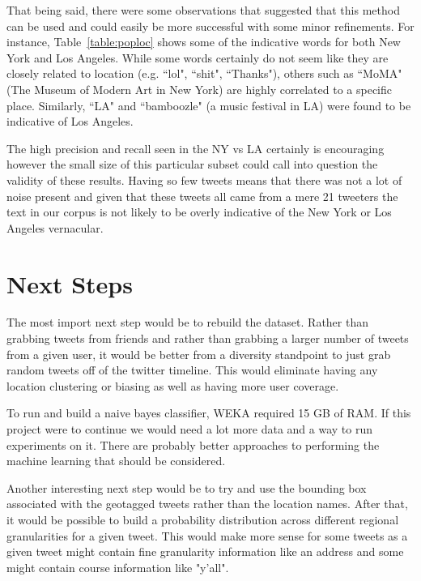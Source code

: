 \documentclass[12pt]{article}
\begin{document}
That being said, there were some observations that suggested that this method can be used and could easily be more successful with some minor refinements.  For instance, Table~\ref{table:poploc} shows some of the indicative words for both New York and Los Angeles.  While some words certainly do not seem like they are closely related to location (e.g. ``lol", ``shit", ``Thanks"), others such as ``MoMA" (The Museum of Modern Art in New York) are highly correlated to a specific place.  Similarly, ``LA" and ``bamboozle" (a music festival in LA) were found to be indicative of Los Angeles.

The high precision and recall seen in the NY vs LA certainly is encouraging however the small size of this particular subset could call into question the validity of these results.  Having so few tweets means that there was not a lot of noise present and given that these tweets all came from a mere 21 tweeters the text in our corpus is not likely to be overly indicative of the New York or Los Angeles vernacular.

\section*{Next Steps}
The most import next step would be to rebuild the dataset.  Rather than grabbing tweets from friends and rather than grabbing a larger number of tweets from a given user, it would be better from a diversity standpoint to just grab random tweets off of the twitter timeline.  This would eliminate having any location clustering or biasing as well as having more user coverage.

To run and build a naive bayes classifier, WEKA required 15 GB of RAM. If this project were to continue we would need a lot more data and a way to run experiments on it. There are probably better approaches to performing the machine learning that should be considered. 

Another interesting next step would be to try and use the bounding box associated with the geotagged tweets rather than the location names.  After that, it would be possible to build a probability distribution across different regional granularities for a given tweet.  This would make more sense for some tweets as a given tweet might contain fine granularity information like an address and some might contain course information like "y'all".  



\end{document}
